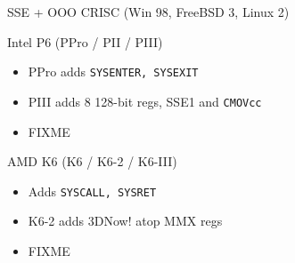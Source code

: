 \documentclass[mathserif,xcolor={dvipsnames,table}]{beamer}
\begin{document}
\begin{frame}[t]{SSE + OOO CRISC (Win 98, FreeBSD 3, Linux 2)}

\begin{block}{Intel P6 (PPro / PII / PIII)}
\begin{itemize}
\item PPro adds \texttt{SYSENTER, SYSEXIT}
\item PIII adds 8 128-bit regs, SSE1 and \texttt{CMOVcc}
\item FIXME
\end{itemize}
\end{block}
\begin{block}{AMD K6 (K6 / K6-2 / K6-III)}
\begin{itemize}
\item Adds \texttt{SYSCALL, SYSRET}
\item K6-2 adds 3DNow! atop MMX regs
\item FIXME
\end{itemize}
\end{block}
\vfill
\begin{center}
\end{center}
\end{frame}
\end{document}
